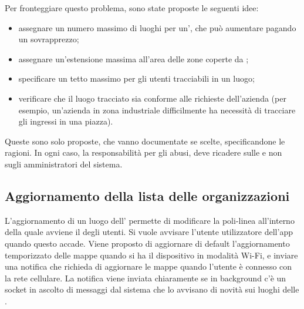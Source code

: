 Per fronteggiare questo problema, sono state proposte le seguenti idee:
\begin{itemize}
	\item assegnare un numero massimo di luoghi per un', che può aumentare pagando un sovrapprezzo;
	\item assegnare un'estensione massima all'area delle zone coperte da ;
	\item specificare un tetto massimo per gli utenti tracciabili in un luogo;
	\item verificare che il luogo tracciato sia conforme alle richieste dell'azienda (per esempio, un'azienda in zona industriale difficilmente ha necessità di tracciare gli ingressi in una piazza).
\end{itemize}
Queste sono solo proposte, che vanno documentate se scelte, specificandone le ragioni. In ogni caso, la responsabilità per gli abusi, deve ricadere sulle  e non sugli amministratori del sistema.

\subsection*{Aggiornamento della lista delle organizzazioni}
L'aggiornamento di un luogo dell' permette di modificare la poli-linea all'interno della quale avviene il  degli utenti. Si vuole avvisare l'utente utilizzatore dell'app quando questo accade.
Viene proposto di aggiornare di default l'aggiornamento temporizzato delle mappe quando si ha il dispositivo in modalità Wi-Fi, e inviare una notifica che richieda di aggiornare le mappe quando l'utente è connesso con la rete cellulare.
La notifica viene inviata chiaramente se in background c'è un socket  in ascolto di messaggi dal sistema che lo avvisano di novità sui luoghi delle .

\clearpage